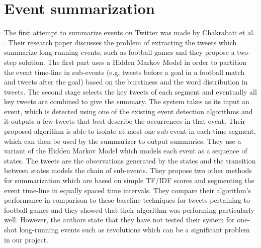 \section{Event summarization}\label{sec:EventSummarizationBack}
The first attempt to summarize events on Twitter was made by Chakrabati et al. \cite{Chakrabarti_Punera_2011}. Their research paper discusses the problem of extracting the tweets which summarize long-running events, such as football games and they propose a two-step solution. The first part uses a Hidden Markov Model in order to partition the event time-line in sub-events (e.g, tweets before a goal in a football match and tweets after the goal) based on the burstiness and the word distribution in tweets. The second stage selects the key tweets of each segment and eventually all key tweets are combined to give the summary. The system takes as its input an event, which is detected using one of the existing event detection algorithms and it outputs a few tweets that best describe the occurrences in that event. Their proposed algorithm is able to isolate at most one sub-event in each time segment, which can then be used by the summarizer to output summaries. They use a variant of the Hidden Markov Model which models each event as a sequence of states. The tweets are the observations generated by the states and the transition between states models the chain of sub-events. They propose two other methods for summarization which are based on simple TF/IDF scores and segmenting the event time-line in equally spaced time intervals. They compare their algorithm’s performance in comparison to these baseline techniques for tweets pertaining to football games and they showed that their algorithm was performing particularly well. However, the authors state that they have not tested their system for one-shot long-running events such as revolutions which can be a significant problem in our project. \\\\
